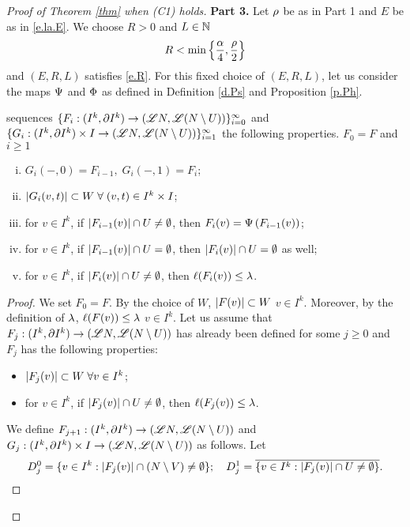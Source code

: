 \documentclass[11pt,twoside]{article}
\begin{document}
\begin{proof}[Proof of Theorem \ref{thm} when (C1) holds]
\noindent\textbf{Part 3.} Let $\rho$ be as in Part 1 and $E$ be as in \eqref{e.la.E}. We choose \(R>0\) and \(L\in \mathbb{N}\) \sot 
\begin{equation}\label{e.R.rh}
R<\min\left\{\frac{\alpha}{4},\frac{\rho}{2} \right\}
\end{equation}
and \((E,R,L)\) satisfies \eqref{e.R}. For this fixed choice of \((E,R,L)\), let us consider the maps \(\Psi\) and \(\Phi\) as defined in Definition \ref{d.Ps} and Proposition \ref{p.Ph}.

\begin{lem}\label{l.F.G}
\Te sequences \(\{F_i:(I^k,\partial I^k)\rightarrow (\mathscr{L} N, \mathscr{L} (N\setminus U))\}_{i=0}^{\infty}\) and \(\{G_i:(I^k,\partial I^k)\times I\rightarrow (\mathscr{L} N, \mathscr{L} (N\setminus U))\}_{i=1}^{\infty}\) \w the following properties. $F_0=F$ and \fa $i\geq 1$
\begin{enumerate}[(i)]
	\item \(G_i(-,0)=F_{i-1},\; G_i(-,1)=F_i\);
	\item $\left|G_i(v,t)\right|\subset W\;\forall\;(v,t)\in I^k\times I$;
	\item for $v\in I^k$, if \(\left|F_{i-1}(v)\right|\cap U\neq \emptyset\), then \(F_i(v)=\Psi\left(F_{i-1}(v)\right)\);
	\item for $v\in I^k$, if \(\left|F_{i-1}(v)\right|\cap U= \emptyset\), then \(\left|F_{i}(v)\right|\cap U= \emptyset\) as well;
	\item for $v\in I^k$, if \(\left|F_i(v)\right|\cap U\neq \emptyset\), then \(\ell(F_i(v))\leq \lambda\).
\end{enumerate}
\end{lem}
\begin{proof}
We set \(F_0=F\). By the choice of \(W\), \(\left|F(v)\right|\subset W\) \fa \(v\in I^k\). Moreover, by the definition of \(\lambda\), \(\ell(F(v))\leq \lambda\) \fa \(v\in I^k\). Let us assume that \(F_j:(I^k,\partial I^k)\rightarrow (\mathscr{L} N, \mathscr{L} (N\setminus U))\) has already been defined for some \(j\geq 0\) and $F_j$ has the following properties:
\begin{itemize}
	\item \(\left|F_j(v)\right|\subset W\;\forall v\in I^k\);
	\item for $v\in I^k$, if \(\left|F_j(v)\right|\cap U\neq \emptyset\), then \(\ell(F_j(v))\leq \lambda\).
\end{itemize}
We define \(F_{j+1}:(I^k,\partial I^k)\rightarrow (\mathscr{L} N, \mathscr{L} (N\setminus U))\) and \(G_j:(I^k,\partial I^k)\times I\rightarrow (\mathscr{L} N, \mathscr{L} (N\setminus U))\) as follows. Let
\[D^0_j=\{v\in I^k: \left|F_j(v)\right|\cap (N\setminus V)\neq \emptyset\};\quad D^1_j=\overline{\{v\in I^k: \left|F_j(v)\right|\cap U\neq \emptyset\}}.\]

\end{proof}
\end{proof}
\end{document}
